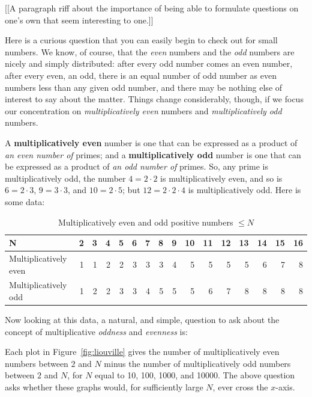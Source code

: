 \documentclass[11pt]{article}
\theoremstyle{plain}
\theoremstyle{definition}
\numberwithin{equation}{section}
\numberwithin{figure}{section}
\numberwithin{table}{section}
\begin{document}
 [[A paragraph riff about the importance of being able to formulate
 questions on one's own that seem interesting to one.]]


Here is a curious question that you can easily begin to check out for
small numbers. We know, of course, that the {\em even} numbers and the
{\em odd} numbers are nicely and simply distributed: after every odd
number comes an even number, after every even, an odd, there is an
equal number of odd number as even numbers less than any given odd
number, and there may be nothing else of interest to say about the
matter.  Things change considerably, though, if we focus our
concentration on {\em multiplicatively even} numbers and {\em
  multiplicatively odd} numbers.
  
  
A {\bf multiplicatively even} number is one that can be expressed as a
product of {\em an even number of} primes; and a {\bf multiplicatively
  odd} number is one that can be expressed as a product of {\em an odd
  number of} primes.  So, any prime is multiplicatively odd, the
number $4 = 2\cdot 2$ is multiplicatively even, and so is $6=2\cdot
3$, $9=3\cdot 3$, and $10= 2\cdot 5$; but $12=2\cdot 2\cdot 4$ is
multiplicatively odd.  Here is some data: \newpage
   
  \begin{table} \caption{Multiplicatively even and odd positive numbers $\le N$}
  \begin{center}
 
\begin{tabular}{|l|r|r|r|r|r|r|r|r|r|r|r|r|r|r|r|}
\hline
N & 2 & 3 & 4 & 5  & 6 & 7 & 8 & 9 & 10 & 11 & 12 & 13 & 14 & 15 & 16  \\ \hline
Multiplicatively even & 1 & 1 & 2 & 2  & 3 & 3 & 3 & 4 & 5 & 5 & 5 & 5 & 6 & 7 & 8 \\ \hline
Multiplicatively odd & 1 & 2 & 2 & 3  & 3 & 4 & 5 & 5 & 5 & 6 & 7 & 8 & 8 & 8 & 8 \\ \hline
\end{tabular}
\end{center}
\end{table}

  
   Now looking at this data, a natural, and simple, question to ask about the concept of multiplicative {\em oddness} and {\em evenness} is: 
   

Each plot in Figure~\ref{fig:liouville} gives the number of
multiplicatively even numbers between $2$ and $N$ minus the number of
multiplicatively odd numbers between $2$ and $N$, for $N$ equal to 10,
100, 1000, and 10000. The above question asks whether these graphs
would, for sufficiently large $N$, ever cross the $x$-axis.
\end{document}
